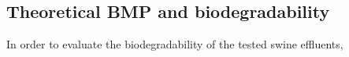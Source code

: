 \subsection{Theoretical BMP and biodegradability}
In order to evaluate the biodegradability of the tested swine effluents, 
